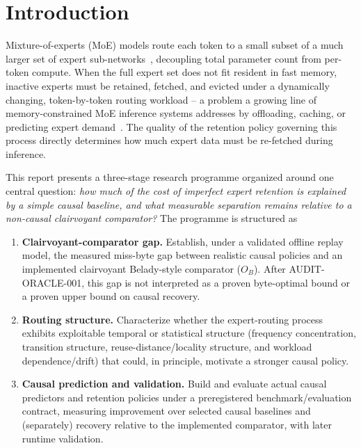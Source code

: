 \section{Introduction}
\label{sec:introduction}

Mixture-of-experts (MoE) models route each token to a small subset of a
much larger set of expert sub-networks~\cite{shazeer2017sparsely},
decoupling total parameter count from per-token compute. When the full
expert set does not fit resident in fast memory, inactive experts must
be retained, fetched, and evicted under a dynamically changing,
token-by-token routing workload -- a problem a growing line of
memory-constrained MoE inference systems addresses by offloading,
caching, or predicting expert demand~\cite{eliseev2023offloading,xue2025moeinfinity,kamahori2025fiddler}. The quality of the retention
policy governing this process directly determines how much expert data
must be re-fetched during inference.

This report presents a three-stage research programme organized around
one central question:
\emph{how much of the cost of imperfect expert retention is explained by a
simple causal baseline, and what measurable separation remains relative to
a non-causal clairvoyant comparator?} The programme is structured as
\begin{enumerate}
 \item \textbf{Clairvoyant-comparator gap.} Establish,
   under a validated offline replay model, the measured miss-byte gap
   between realistic causal policies and an implemented clairvoyant
   Belady-style comparator ($O_B$). After \textsc{AUDIT-ORACLE-001}, this
   gap is not interpreted as a proven byte-optimal bound or a proven upper
   bound on causal recovery.
 \item \textbf{Routing structure.} Characterize whether
   the expert-routing process exhibits exploitable temporal or
   statistical structure (frequency concentration, transition structure,
   reuse-distance/locality structure, and workload dependence/drift) that
   could, in principle, motivate a stronger causal policy.
 \item \textbf{Causal prediction and validation.} Build
   and evaluate actual causal predictors and retention policies under a
   preregistered benchmark/evaluation contract, measuring improvement over
   selected causal baselines and (separately) recovery relative to the
   implemented comparator, with later runtime validation.
\end{enumerate}

